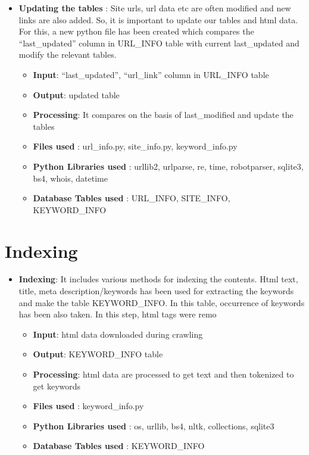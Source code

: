 \documentclass{scrreprt}
\begin{document}
\begin{itemize}

\item\textbf {Updating the tables} : Site urls, url data etc are often modified and new links are also added. So, it is important to update our tables and html data. For this, a new python file has been created which compares the “last_updated” column in URL_INFO table with current last_updated and modify the relevant tables.

    \begin{itemize}
     \item \textbf{Input}: “last_updated”, “url_link” column in URL_INFO table
     \item \textbf{Output}: updated table
     \item \textbf{Processing}: It compares on the basis of last_modified and update the tables
     \item \textbf{Files used} : url_info.py, site_info.py, keyword_info.py
        \item \textbf{Python Libraries used} : urllib2, urlparse, re, time, robotparser, sqlite3, bs4, whois, datetime

        \item \textbf{Database Tables used} : URL_INFO, SITE_INFO, KEYWORD_INFO
        
   
     \end{itemize}
\end{itemize}


\section{Indexing}
\begin{itemize}

\item\textbf {Indexing}: It includes various methods for indexing the contents. Html text, title, meta description/keywords has been used for extracting the keywords and make the table KEYWORD_INFO. In this table, occurrence of keywords has been also taken. In this step, html tags were remo
    \begin{itemize}
     \item \textbf{Input}: html data downloaded during crawling
    \item \textbf{Output}: KEYWORD_INFO table
    \item \textbf{Processing}: html data are processed to get text and then tokenized to get keywords
     \item \textbf{Files used} : keyword_info.py
        \item \textbf{Python Libraries used} : os, urllib, bs4, nltk, collections, sqlite3
   
  
        \item \textbf{Database Tables used} : KEYWORD_INFO
        

     \end{itemize}
\end{itemize}
\end{document}
